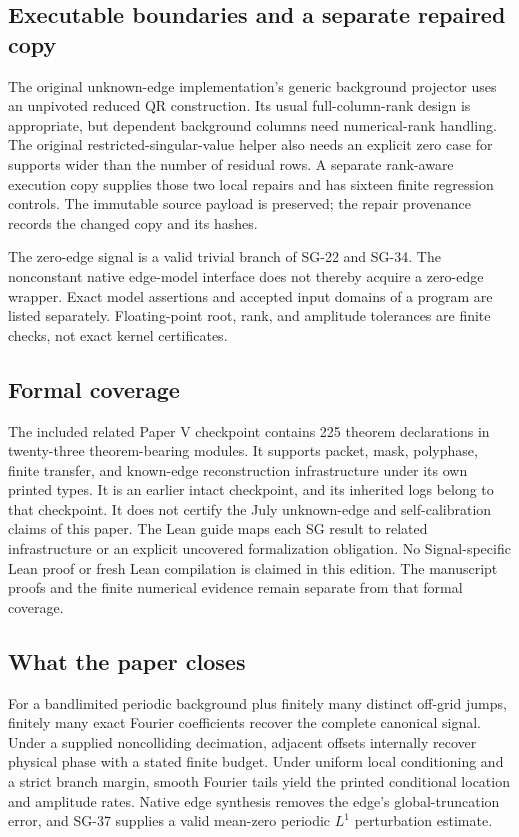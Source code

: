 \documentclass[11pt]{article}
\theoremstyle{definition}\newtheorem{definition}[theorem]{Definition}
\theoremstyle{remark}\newtheorem{remark}[theorem]{Remark}
\begin{document}
\subsection{Executable boundaries and a separate repaired copy}
The original unknown-edge implementation's generic background projector uses
an unpivoted reduced QR construction. Its usual full-column-rank design is
appropriate, but dependent background columns need numerical-rank handling.
The original restricted-singular-value helper also needs an explicit zero
case for supports wider than the number of residual rows. A separate
rank-aware execution copy supplies those two local repairs and has sixteen
finite regression controls. The immutable source payload is preserved;
the repair provenance records the changed copy and its hashes.

The zero-edge signal is a valid trivial branch of SG-22 and SG-34. The
nonconstant native edge-model interface does not thereby acquire a zero-edge
wrapper. Exact model assertions and accepted input domains of a program are
listed separately. Floating-point root, rank, and amplitude tolerances are
finite checks, not exact kernel certificates.

\subsection{Formal coverage}
The included related Paper V checkpoint contains 225 theorem declarations
in twenty-three theorem-bearing modules. It supports packet, mask, polyphase,
finite transfer, and known-edge reconstruction infrastructure under its own
printed types. It is an earlier intact checkpoint, and its inherited logs
belong to that checkpoint. It does not certify the July unknown-edge and
self-calibration claims of this paper. The Lean guide maps each SG result to
related infrastructure or an explicit uncovered formalization obligation.
No Signal-specific Lean proof or fresh Lean compilation is claimed in this
edition. The manuscript proofs and the finite numerical evidence remain
separate from that formal coverage.

\subsection{What the paper closes}
For a bandlimited periodic background plus finitely many distinct off-grid
jumps, finitely many exact Fourier coefficients recover the complete canonical
signal. Under a supplied noncolliding decimation, adjacent offsets internally
recover physical phase with a stated finite budget. Under uniform local
conditioning and a strict branch margin, smooth Fourier tails yield the
printed conditional location and amplitude rates. Native edge synthesis
removes the edge's global-truncation error, and SG-37 supplies a valid
mean-zero periodic $L^1$ perturbation estimate.
\end{document}
